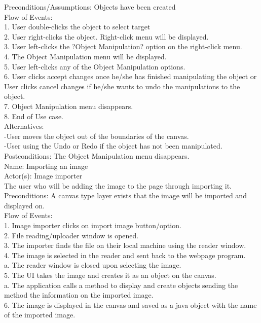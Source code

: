 \documentclass[12pt]{report}
\begin{document}
Preconditions/Assumptions: Objects have been created\\[1\baselineskip]
Flow of Events: \\
1. User double-clicks the object to select target\\
2. User right-clicks the object. Right-click menu will be displayed.\\
3. User left-clicks the ?Object Manipulation? option on the right-click menu.\\
4. The Object Manipulation menu will be displayed. \\
5. User left-clicks any of the Object Manipulation options.\\
6. User clicks accept changes once he/she has finished manipulating the object or User clicks cancel changes if he/she wants to undo the manipulations to the object.\\
7. Object Manipulation menu disappears.\\
8. End of Use case.\\[1\baselineskip]
Alternatives:\\
-User moves the object out of the boundaries of the canvas.\\
-User using the Undo or Redo if the object has not been manipulated. \\[1\baselineskip]
Postconditions: The Object Manipulation menu disappears.\\[2\baselineskip]

Name: Importing an image\\
Actor(s): Image importer\\
The user who will be adding the image to the page through importing it.\\
Preconditions: A canvas type layer exists that the image will be imported and displayed on.\\[0\baselineskip]

Flow of Events:\\
1.       Image importer clicks on import image button/option.\\
2.       File reading/uploader window is opened.\\
3.       The importer finds the file on their local machine using the reader window.\\
4.       The image is selected in the reader and sent back to the webpage program.\\
a.       The reader window is closed upon selecting the image.\\
5.        The UI takes the image and creates it as an object on the canvas.\\
a.       The application calls a method to display and create objects sending the method the information on the imported image.\\
6.       The image is displayed in the canvas and saved as a java object with the name of the imported image. \\[0\baselineskip]
\end{document}
